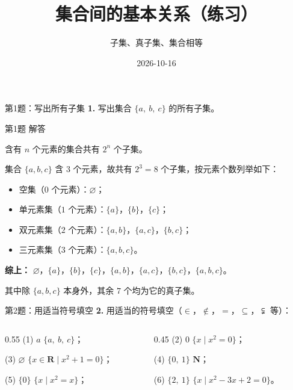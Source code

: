 \documentclass[10pt,aspectratio=169,serif]{beamer}
\title[集合间的基本关系练习]{集合间的基本关系（练习）}
\subtitle{子集、真子集、集合相等}
\author{}
\institute{}
\date{2026-10-16}
\begin{document}
\begin{frame}
  \titlepage
\end{frame}

\begin{frame}[t]{第1题：写出所有子集}
\textbf{1.} 写出集合 $\{a,\ b,\ c\}$ 的所有子集。
\end{frame}

\begin{frame}[t]{第1题 解答}
\begin{tcolorbox}[colback=orange!10,colframe=orange,title=\textbf{解}]
含有 $n$ 个元素的集合共有 $2^n$ 个子集。

集合 $\{a, b, c\}$ 含 $3$ 个元素，故共有 $2^3 = 8$ 个子集，按元素个数列举如下：

\vspace{0.5em}
\begin{itemize}
  \item 空集（$0$ 个元素）：$\varnothing$；
  \item 单元素集（$1$ 个元素）：$\{a\}$，$\{b\}$，$\{c\}$；
  \item 双元素集（$2$ 个元素）：$\{a,b\}$，$\{a,c\}$，$\{b,c\}$；
  \item 三元素集（$3$ 个元素）：$\{a,b,c\}$。
\end{itemize}

\vspace{0.5em}
\textbf{综上：} $\varnothing$，$\{a\}$，$\{b\}$，$\{c\}$，$\{a,b\}$，$\{a,c\}$，$\{b,c\}$，$\{a,b,c\}$。

\vspace{0.3em}
{\small 其中除 $\{a,b,c\}$ 本身外，其余 $7$ 个均为它的真子集。}
\end{tcolorbox}
\end{frame}

\begin{frame}[t]{第2题：用适当符号填空}
\textbf{2.} 用适当的符号填空（$\in$，$\notin$，$=$，$\subseteq$，$\subsetneqq$ 等）：

\vspace{0.8em}
\begin{columns}
\begin{column}{0.55\textwidth}
(1) $a$ \underline{\hspace{1em}} $\{a,\ b,\ c\}$；

(3) $\varnothing$ \underline{\hspace{1em}} $\{x \in \mathbf{R} \mid x^2 + 1 = 0\}$；

(5) $\{0\}$ \underline{\hspace{1em}} $\{x \mid x^2 = x\}$；
\end{column}
\begin{column}{0.45\textwidth}
(2) $0$ \underline{\hspace{1em}} $\{x \mid x^2 = 0\}$；

(4) $\{0,\ 1\}$ \underline{\hspace{1em}} $\mathbf{N}$；

(6) $\{2,\ 1\}$ \underline{\hspace{1em}} $\{x \mid x^2 - 3x + 2 = 0\}$。
\end{column}
\end{columns}
\end{frame}
\end{document}
